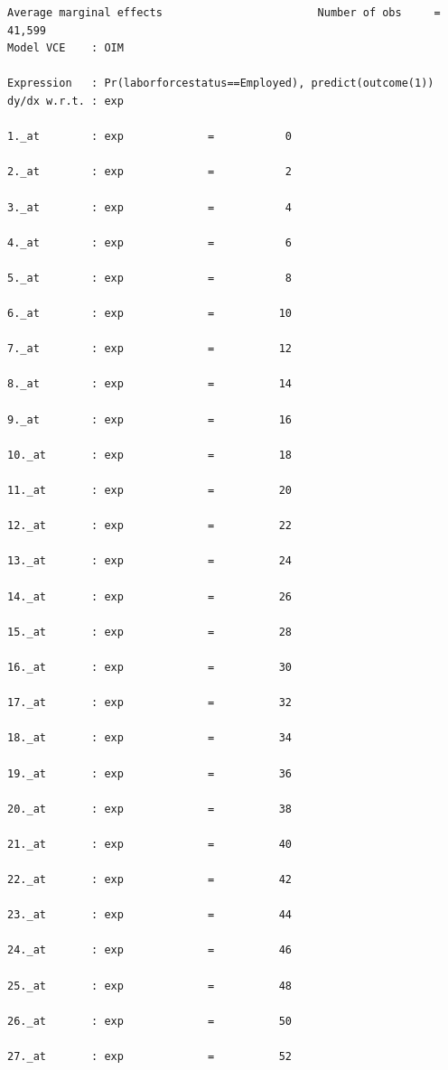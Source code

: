 \documentclass[
]{book}
\begin{document}
\begin{verbatim}
Average marginal effects                        Number of obs     =     41,599
Model VCE    : OIM

Expression   : Pr(laborforcestatus==Employed), predict(outcome(1))
dy/dx w.r.t. : exp

1._at        : exp             =           0

2._at        : exp             =           2

3._at        : exp             =           4

4._at        : exp             =           6

5._at        : exp             =           8

6._at        : exp             =          10

7._at        : exp             =          12

8._at        : exp             =          14

9._at        : exp             =          16

10._at       : exp             =          18

11._at       : exp             =          20

12._at       : exp             =          22

13._at       : exp             =          24

14._at       : exp             =          26

15._at       : exp             =          28

16._at       : exp             =          30

17._at       : exp             =          32

18._at       : exp             =          34

19._at       : exp             =          36

20._at       : exp             =          38

21._at       : exp             =          40

22._at       : exp             =          42

23._at       : exp             =          44

24._at       : exp             =          46

25._at       : exp             =          48

26._at       : exp             =          50

27._at       : exp             =          52


\end{verbatim}
\end{document}
